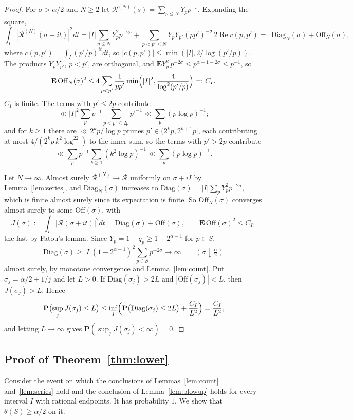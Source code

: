 \documentclass[11pt]{amsart}
\theoremstyle{remark}
\numberwithin{equation}{section}
\newcommand{\Prob}{\mathbf{P}}
\newcommand{\Ex}{\mathbf{E}}
\newcommand{\cR}{\mathcal{R}}
\DeclareMathOperator{\re}{Re}
\begin{document}
\begin{proof}
For $\sigma>\alpha/2$ and $N\ge2$ let $\cR^{(N)}(s)=\sum_{p\le N}Y_pp^{-s}$. Expanding the square,
\[
\int_I|\cR^{(N)}(\sigma+it)|^2dt=|I|\sum_{p\le N}Y_p^2p^{-2\sigma}+\sum_{p<p'\le N}Y_pY_{p'}(pp')^{-\sigma}\,2\re c(p,p')=:\mathrm{Diag}_N(\sigma)+\mathrm{Off}_N(\sigma),
\]
where $c(p,p')=\int_I(p'/p)^{it}dt$, so $|c(p,p')|\le\min(|I|,2/\log(p'/p))$. The products $Y_pY_{p'}$, $p<p'$, are orthogonal, and $\Ex Y_p^2\,p^{-2\sigma}\le p^{\alpha-1-2\sigma}\le p^{-1}$, so
\[
\Ex\,\mathrm{Off}_N(\sigma)^2\le4\sum_{p<p'}\frac1{pp'}\min\Bigl(|I|^2,\frac4{\log^2(p'/p)}\Bigr)=:C_I .
\]
$C_I$ is finite. The terms with $p'\le2p$ contribute
\[
\ll|I|^2\sum_pp^{-1}\sum_{p<p'\le2p}p'^{-1}\ll\sum_p(p\log p)^{-1};
\]
and for $k\ge1$ there are $\ll2^kp/\log p$ primes $p'\in(2^kp,2^{k+1}p]$, each contributing at most $4/(2^kp\,k^2\log^22)$ to the inner sum, so the terms with $p'>2p$ contribute
\[
\ll\sum_pp^{-1}\sum_{k\ge1}(k^2\log p)^{-1}\ll\sum_p(p\log p)^{-1}.
\]

Let $N\to\infty$. Almost surely $\cR^{(N)}\to\cR$ uniformly on $\sigma+iI$ by Lemma~\ref{lem:series}, and $\mathrm{Diag}_N(\sigma)$ increases to $\mathrm{Diag}(\sigma)=|I|\sum_pY_p^2p^{-2\sigma}$, which is finite almost surely since its expectation is finite. So $\mathrm{Off}_N(\sigma)$ converges almost surely to some $\mathrm{Off}(\sigma)$, with
\[
J(\sigma):=\int_I|\cR(\sigma+it)|^2dt=\mathrm{Diag}(\sigma)+\mathrm{Off}(\sigma),\qquad \Ex\,\mathrm{Off}(\sigma)^2\le C_I ,
\]
the last by Fatou's lemma. Since $Y_p=1-q_p\ge1-2^{\alpha-1}$ for $p\in S$,
\[
\mathrm{Diag}(\sigma)\ge|I|(1-2^{\alpha-1})^2\sum_{p\in S}p^{-2\sigma}\longrightarrow\infty\qquad(\sigma\downarrow\tfrac{\alpha}{2})
\]
almost surely, by monotone convergence and Lemma~\ref{lem:count}. Put $\sigma_j=\alpha/2+1/j$ and let $L>0$. If $\mathrm{Diag}(\sigma_j)>2L$ and $|\mathrm{Off}(\sigma_j)|<L$, then $J(\sigma_j)>L$. Hence
\[
\Prob\bigl(\sup_jJ(\sigma_j)\le L\bigr)\le\inf_j\Bigl(\Prob\bigl(\mathrm{Diag}(\sigma_j)\le2L\bigr)+\frac{C_I}{L^2}\Bigr)=\frac{C_I}{L^2},
\]
and letting $L\to\infty$ gives $\Prob(\sup_jJ(\sigma_j)<\infty)=0$.
\end{proof}

\subsection{Proof of Theorem~\ref{thm:lower}}
Consider the event on which the conclusions of Lemmas~\ref{lem:count} and~\ref{lem:series} hold and the conclusion of Lemma~\ref{lem:blowup} holds for every interval $I$ with rational endpoints. It has probability $1$. We show that $\theta(S)\ge\alpha/2$ on it.
\end{document}
